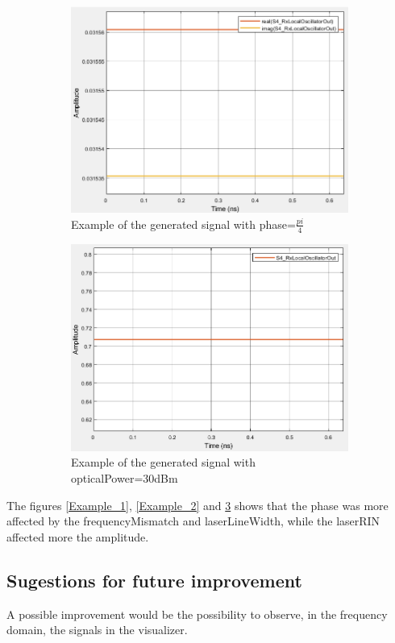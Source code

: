 \begin{figure}[H]
	\centering
        \begin{subfigure}{.55\textwidth}
        \centering
        	\includegraphics[scale=0.45]{./lib/local_oscillator/Figures/Phase_pi_4.png}
        	\caption{Example of the generated signal with phase=$\frac{pi}{4} $ }\label{Example_Phase}
        \end{subfigure}%
        \begin{subfigure}{.55\textwidth}
        \centering
        	\includegraphics[scale=0.45]{./lib/local_oscillator/Figures/Power_30dBm.png}
        	\caption{Example of the generated signal with opticalPower=30dBm }\label{Example_Power}
        \end{subfigure}
        \caption{}\label{Example_3}
\end{figure}
The figures \ref{Example_1}, \ref{Example_2} and \ref{Example_3} shows that the phase was more affected by the frequencyMismatch and laserLineWidth, while the laserRIN affected more the amplitude.

\subsection*{Sugestions for future improvement}
A possible improvement would be the possibility to observe, in the frequency domain, the signals in the visualizer.

